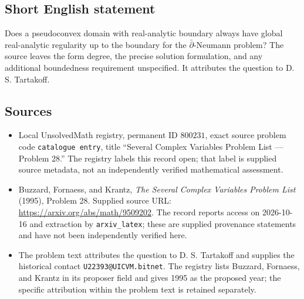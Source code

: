 \documentclass[11pt]{article}
\begin{document}
\subsection{Short English statement}
Does a pseudoconvex domain with real-analytic boundary always have global real-analytic regularity up to the boundary for the \(\bar\partial\)-Neumann problem? The source leaves the form degree, the precise solution formulation, and any additional boundedness requirement unspecified. It attributes the question to D. S. Tartakoff.
\subsection{Sources}
\begin{itemize}
\item Local UnsolvedMath registry, permanent ID \(800231\), exact source problem code \texttt{catalogue entry}, title ``Several Complex Variables Problem List --- Problem 28.'' The registry labels this record open; that label is supplied source metadata, not an independently verified mathematical assessment.
\item Buzzard, Fornaess, and Krantz, \emph{The Several Complex Variables Problem List} (1995), Problem 28. Supplied source URL: \url{https://arxiv.org/abs/math/9509202}. The record reports access on 2026-10-16 and extraction by \texttt{arxiv\_latex}; these are supplied provenance statements and have not been independently verified here.
\item The problem text attributes the question to D. S. Tartakoff and supplies the historical contact \texttt{U22393@UICVM.bitnet}. The registry lists Buzzard, Fornaess, and Krantz in its proposer field and gives 1995 as the proposed year; the specific attribution within the problem text is retained separately.
\end{itemize}
\end{document}

